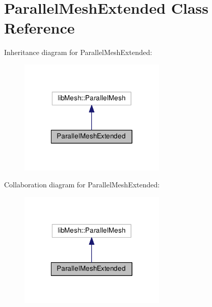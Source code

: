 \hypertarget{class_parallel_mesh_extended}{\section{Parallel\-Mesh\-Extended Class Reference}
\label{class_parallel_mesh_extended}
}


Inheritance diagram for Parallel\-Mesh\-Extended\-:\nopagebreak
\begin{figure}[H]
\begin{center}
\leavevmode
\includegraphics[width=198pt]{class_parallel_mesh_extended__inherit__graph}
\end{center}
\end{figure}


Collaboration diagram for Parallel\-Mesh\-Extended\-:\nopagebreak
\begin{figure}[H]
\begin{center}
\leavevmode
\includegraphics[width=198pt]{class_parallel_mesh_extended__coll__graph}
\end{center}
\end{figure}
